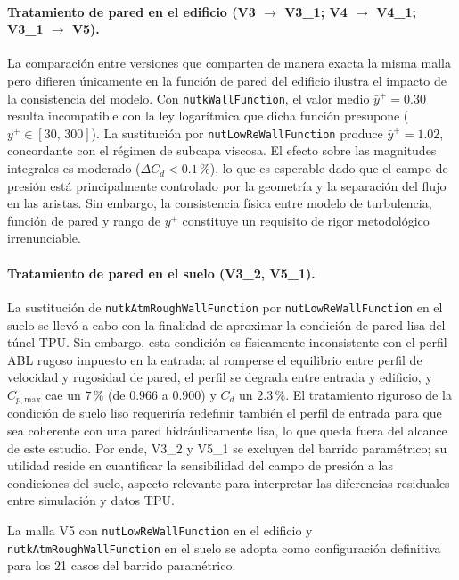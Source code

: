 \paragraph{Tratamiento de pared en el edificio (V3 $\to$ V3\_1; V4 $\to$ V4\_1; V3\_1 $\to$ V5).}
La comparación entre versiones que comparten de manera exacta la misma malla pero difieren únicamente en la función de pared del edificio ilustra el impacto de la consistencia del modelo. Con \texttt{nutkWallFunction}, el valor medio $\bar{y}^+ = 0.30$ resulta incompatible con la ley logarítmica que dicha función presupone ($y^+ \in [30,\,300]$). La sustitución por \texttt{nutLowReWallFunction} produce $\bar{y}^+ = 1.02$, concordante con el régimen de subcapa viscosa. El efecto sobre las magnitudes integrales es moderado ($\Delta C_d < 0.1\,\%$), lo que es esperable dado que el campo de presión está principalmente controlado por la geometría y la separación del flujo en las aristas. Sin embargo, la consistencia física entre modelo de turbulencia, función de pared y rango de $y^+$ constituye un requisito de rigor metodológico irrenunciable.

\paragraph{Tratamiento de pared en el suelo (V3\_2, V5\_1).}
La sustitución de \texttt{nutkAtmRoughWallFunction} por \texttt{nutLowReWallFunction} en el suelo se llevó a cabo con la finalidad de aproximar la condición de pared lisa del túnel TPU. Sin embargo, esta condición es físicamente inconsistente con el perfil ABL rugoso impuesto en la entrada: al romperse el equilibrio entre perfil de velocidad y rugosidad de pared, el perfil se degrada entre entrada y edificio, y $C_{p,\mathrm{max}}$ cae un $7\,\%$ (de $0.966$ a $0.900$) y $C_d$ un $2.3\,\%$. El tratamiento riguroso de la condición de suelo liso requeriría redefinir también el perfil de entrada para que sea coherente con una pared hidráulicamente lisa, lo que queda fuera del alcance de este estudio. Por ende, V3\_2 y V5\_1 se excluyen del barrido paramétrico; su utilidad reside en cuantificar la sensibilidad del campo de presión a las condiciones del suelo, aspecto relevante para interpretar las diferencias residuales entre simulación y datos TPU.

La malla V5 con \texttt{nutLowReWallFunction} en el edificio y \texttt{nutkAtmRoughWallFunction} en el suelo se adopta como configuración definitiva para los 21 casos del barrido paramétrico.

